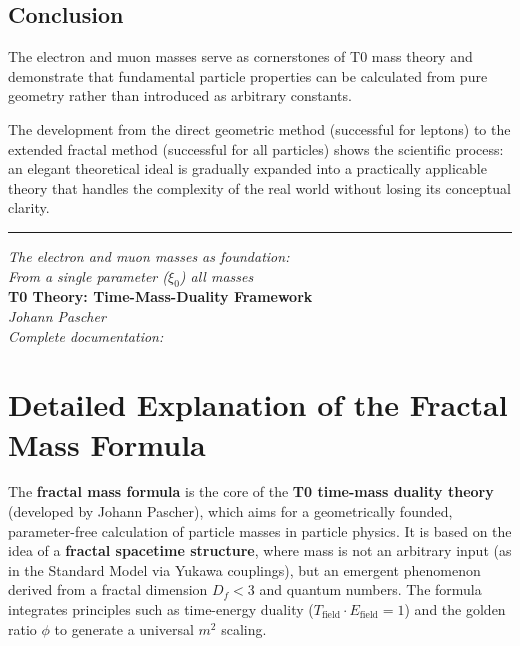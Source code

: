 		\subsection{Conclusion}
	
	The electron and muon masses serve as cornerstones of T0 mass theory and demonstrate that fundamental particle properties can be calculated from pure geometry rather than introduced as arbitrary constants.
	
	The development from the direct geometric method (successful for leptons) to the extended fractal method (successful for all particles) shows the scientific process: an elegant theoretical ideal is gradually expanded into a practically applicable theory that handles the complexity of the real world without losing its conceptual clarity.
	
	\begin{center}
		\hrule
		\vspace{0.5cm}
		\textit{The electron and muon masses as foundation:}\\
		\textit{From a single parameter ($\xi_0$) all masses}\\
		\vspace{0.3cm}
		\textbf{T0 Theory: Time-Mass-Duality Framework}\\
		\textit{Johann Pascher}\\
		\vspace{0.3cm}
		\textit{Complete documentation:}\\
		
	\end{center}
	
	\appendix
	
	\section{Detailed Explanation of the Fractal Mass Formula}
	
	The \textbf{fractal mass formula} is the core of the \textbf{T0 time-mass duality theory} (developed by Johann Pascher), which aims for a geometrically founded, parameter-free calculation of particle masses in particle physics. It is based on the idea of a \textbf{fractal spacetime structure}, where mass is not an arbitrary input (as in the Standard Model via Yukawa couplings), but an emergent phenomenon derived from a fractal dimension $D_f < 3$ and quantum numbers. The formula integrates principles such as time-energy duality ($T_{\text{field}} \cdot E_{\text{field}} = 1$) and the golden ratio $\phi$ to generate a universal $m^2$ scaling.
	
